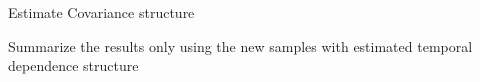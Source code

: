 \documentclass[serif,mathserif,final,table]{beamer}
\begin{document}
\begin{frame}{}
\begin{columns}[t]
\begin{column}{0.235\linewidth}
    	      \begin{block}{Estimate Covariance structure}
    	       		 \begin{algorithm}[H]
    	       		 	\SetAlgoLined
    	       		 	\caption{\textcolor{darkblue}{1. }\textbf{Scanning with temporal independence}}
    	       			\end{algorithm}
    	       		   	 \begin{algorithm}[H]
    	       		   	 	\caption{\textcolor{darkblue}{2. }\textbf{Estimating covariance structure}}
    	       		   	\end{algorithm}
    	       		    \begin{algorithm}[H]
    	       		    	\caption{\textcolor{darkblue}{3. }\textbf{Running with temporal dependence}}
    	       		   	Summarize the results only using the new samples with estimated temporal dependence structure
    	       		   \end{algorithm}    	       		  
    	      \end{block}
    	      

\end{column}
\end{columns}
\end{frame}
\end{document}
